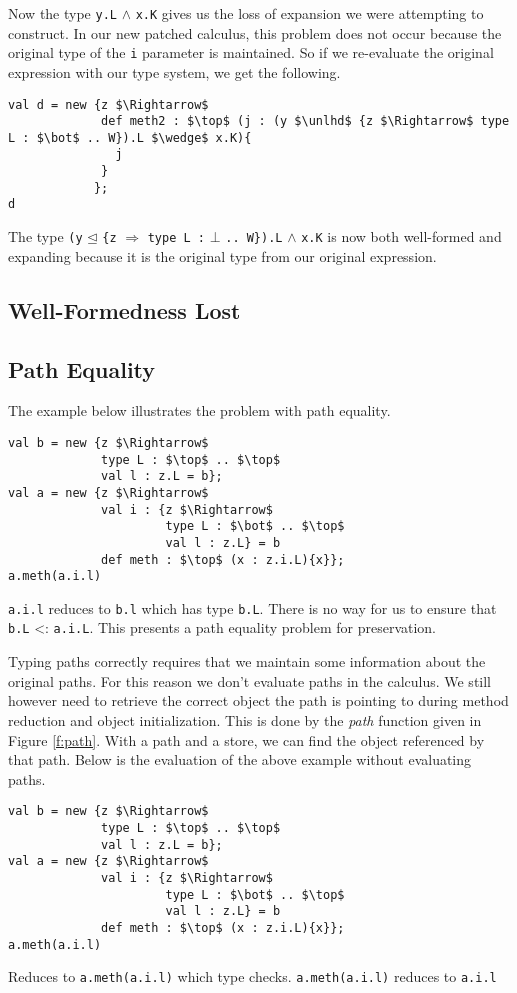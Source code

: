 \documentclass{llncs}
\begin{document}
Now the type \texttt{y.L} $\wedge$ \texttt{x.K} gives us the loss of 
expansion we were attempting to construct. In our new patched calculus, 
this problem does not occur because the original type of the \texttt{i} 
parameter is maintained. So if we re-evaluate the original expression 
with our type system, we get the following.
\begin{lstlisting}[mathescape, style=custom_lang]
val d = new {z $\Rightarrow$
             def meth2 : $\top$ (j : (y $\unlhd$ {z $\Rightarrow$ type L : $\bot$ .. W}).L $\wedge$ x.K){
               j
             }
            };
d
\end{lstlisting}
The type \texttt{(y} $\unlhd$ \texttt{\{z} $\Rightarrow$ 
\texttt{type L :} $\bot$ \texttt{.. W\}).L} $\wedge$ \texttt{x.K} is now 
both well-formed and expanding because it is the original type 
from our original expression.



\subsection{Well-Formedness Lost}



\subsection{Path Equality}
\label{s:patheq}
The example below illustrates the problem with path equality.
\begin{lstlisting}[mathescape, style=custom_lang]
val b = new {z $\Rightarrow$
             type L : $\top$ .. $\top$
             val l : z.L = b};
val a = new {z $\Rightarrow$
             val i : {z $\Rightarrow$
                      type L : $\bot$ .. $\top$
                      val l : z.L} = b
             def meth : $\top$ (x : z.i.L){x}};
a.meth(a.i.l)
\end{lstlisting}
\texttt{a.i.l} reduces to \texttt{b.l} which has type \texttt{b.L}. 
There is no way for us to ensure that \texttt{b.L} <: \texttt{a.i.L}.
This presents a path equality problem for preservation.

Typing paths correctly requires that we maintain some information 
about the original paths. For this reason we don't evaluate paths 
in the calculus. We still however need to retrieve the correct object 
the path is pointing to during method reduction and object initialization. 
This is done by the \emph{path} function given in Figure \ref{f:path}. 
With a path and a store, we can find the object referenced by that path.
Below is the evaluation of the above example without evaluating paths.
\begin{lstlisting}[mathescape, style=custom_lang]
val b = new {z $\Rightarrow$
             type L : $\top$ .. $\top$
             val l : z.L = b};
val a = new {z $\Rightarrow$
             val i : {z $\Rightarrow$
                      type L : $\bot$ .. $\top$
                      val l : z.L} = b
             def meth : $\top$ (x : z.i.L){x}};
a.meth(a.i.l)
\end{lstlisting}
Reduces to \texttt{a.meth(a.i.l)} which type checks. \texttt{a.meth(a.i.l)}
reduces to \texttt{a.i.l}
\end{document}

